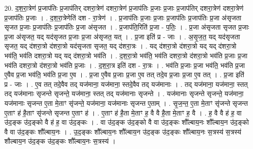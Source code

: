 \documentclass[17pt]{extarticle}
\begin{document}
20. द॒श॒रा॒त्रेण॑ प्र॒जाप॑तिः प्र॒जाप॑तिर् दशरा॒त्रेण॑ दशरा॒त्रेण॑ प्र॒जाप॑तिः प्र॒जाः प्र॒जाः प्र॒जाप॑तिर् दशरा॒त्रेण॑ दशरा॒त्रेण॑ प्र॒जाप॑तिः प्र॒जाः । . द॒श॒रा॒त्रेणेति॑ दश - रा॒त्रेण॑ । . प्र॒जाप॑तिः प्र॒जाः प्र॒जाः प्र॒जाप॑तिः प्र॒जाप॑तिः प्र॒जा अ॑सृजता सृजत प्र॒जाः प्र॒जाप॑तिः प्र॒जाप॑तिः प्र॒जा अ॑सृजत । . प्र॒जाप॑ति॒रिति॑ प्र॒जा - प॒तिः॒ । . प्र॒जा अ॑सृजता सृजत प्र॒जाः प्र॒जा अ॑सृजत॒ यद् यद॑सृजत प्र॒जाः प्र॒जा अ॑सृजत॒ यत् । . प्र॒जा इति॑ प्र - जाः । . अ॒सृ॒ज॒त॒ यद् यद॑सृजता सृजत॒ यद् द॑शरा॒त्रो द॑शरा॒त्रो यद॑सृजता सृजत॒ यद् द॑शरा॒त्रः । . यद् द॑शरा॒त्रो द॑शरा॒त्रो यद् यद् द॑शरा॒त्रो भव॑ति॒ भव॑ति दशरा॒त्रो यद् यद् द॑शरा॒त्रो भव॑ति । . द॒श॒रा॒त्रो भव॑ति॒ भव॑ति दशरा॒त्रो द॑शरा॒त्रो भव॑ति प्र॒जाः प्र॒जा भव॑ति दशरा॒त्रो द॑शरा॒त्रो भव॑ति प्र॒जाः । . द॒श॒रा॒त्र इति॑ दश - रा॒त्रः । . भव॑ति प्र॒जाः प्र॒जा भव॑ति॒ भव॑ति प्र॒जा ए॒वैव प्र॒जा भव॑ति॒ भव॑ति प्र॒जा ए॒व । . प्र॒जा ए॒वैव प्र॒जाः प्र॒जा ए॒व तत् तदे॒व प्र॒जाः प्र॒जा ए॒व तत् । . प्र॒जा इति॑ प्र - जाः । . ए॒व तत् तदे॒वैव तद् यज॑माना॒ यज॑माना॒ स्तदे॒वैव तद् यज॑मानाः । . तद् यज॑माना॒ यज॑माना॒ स्तत् तद् यज॑मानाः सृजन्ते सृजन्ते॒ यज॑माना॒ स्तत् तद् यज॑मानाः सृजन्ते । . यज॑मानाः सृजन्ते सृजन्ते॒ यज॑माना॒ यज॑मानाः सृजन्त ए॒ता मे॒ताꣳ सृ॑जन्ते॒ यज॑माना॒ यज॑मानाः सृजन्त ए॒ताम् । . सृ॒ज॒न्त॒ ए॒ता मे॒ताꣳ सृ॑जन्ते सृजन्त ए॒ताꣳ ह॑ है॒ताꣳ सृ॑जन्ते सृजन्त ए॒ताꣳ ह॑ । . ए॒ताꣳ ह॑ है॒ता मे॒ताꣳ ह॒ वै वै है॒ता मे॒ताꣳ ह॒ वै । . ह॒ वै वै ह॑ ह॒ वा उ॑द॒ङ्क उ॑द॒ङ्को वै ह॑ ह॒ वा उ॑द॒ङ्कः । . वा उ॑द॒ङ्क उ॑द॒ङ्को वै वा उ॑द॒ङ्कः शौ᳚ल्बाय॒नः शौ᳚ल्बाय॒न उ॑द॒ङ्को वै वा उ॑द॒ङ्कः शौ᳚ल्बाय॒नः । . उ॒द॒ङ्कः शौ᳚ल्बाय॒नः शौ᳚ल्बाय॒न उ॑द॒ङ्क उ॑द॒ङ्कः शौ᳚ल्बाय॒नः स॒त्रस्य॑ स॒त्रस्य॑ शौल्बाय॒न उ॑द॒ङ्क उ॑द॒ङ्कः शौ᳚ल्बाय॒नः स॒त्रस्य॑ । \newline
\end{document}

